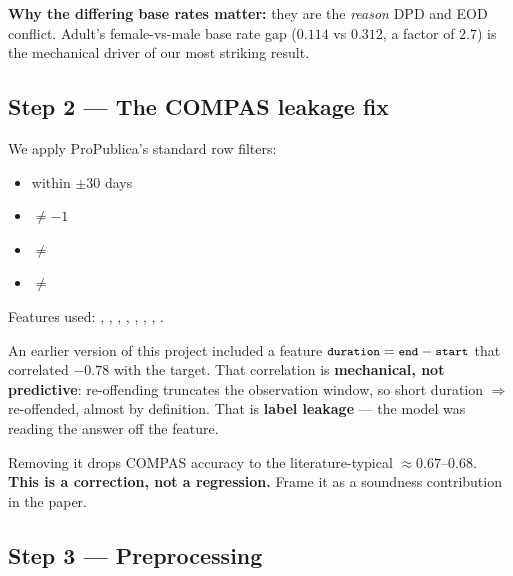 \textbf{Why the differing base rates matter:} they are the \emph{reason} DPD and
EOD conflict. Adult's female-vs-male base rate gap ($0.114$ vs $0.312$, a factor
of $2.7$) is the mechanical driver of our most striking result.

\subsection{Step 2 --- The COMPAS leakage fix}

We apply ProPublica's standard row filters:
\begin{itemize}
\item {} within $\pm30$ days
\item {} $\ne -1$
\item {} $\ne$ 
\item {} $\ne$ 
\end{itemize}
Features used:
, , , ,
, , ,
.

\begin{keybox}
An earlier version of this project included a feature
$\texttt{\small duration} = \texttt{\small end} - \texttt{\small start}$ that correlated $\boldsymbol{-0.78}$
with the target. That correlation is \textbf{mechanical, not predictive}:
re-offending truncates the observation window, so short duration $\Rightarrow$
re-offended, almost by definition. That is \textbf{label leakage} --- the model
was reading the answer off the feature.

Removing it drops COMPAS accuracy to the literature-typical
$\approx 0.67$--$0.68$. \textbf{This is a correction, not a regression.} Frame it
as a soundness contribution in the paper.
\end{keybox}

\subsection{Step 3 --- Preprocessing}

